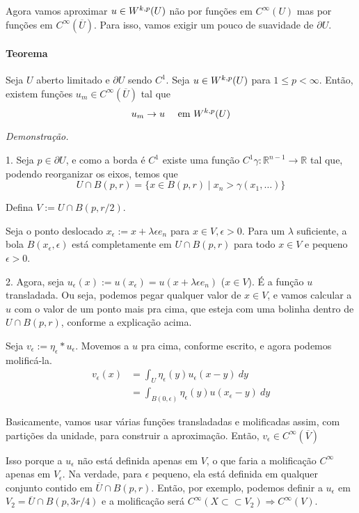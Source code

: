 \documentclass[11pt]{article}
\newcommand{\R}{\mathbb{R}}
\newcommand{\pu}{\partial U}
\newcommand{\e}{\epsilon}
\begin{document}
Agora vamos aproximar \( u \in W^{k,p}(U) \) não por funções em \( C^\infty(U) \) mas por funções em \( C^\infty(\overline{U}) \). Para isso, vamos exigir um pouco de suavidade de \( \pu \).

\paragraph{Teorema} Seja \( U \) aberto limitado e \( \pu \) sendo \( C^1 \). Seja \( u \in W^{k,p}(U) \) para \( 1 \leq p < \infty \). Então, existem funções \( u_m \in C^\infty(\overline{U}) \) tal que \[ u_m \rightarrow u \quad \text{ em }W^{k,p}(U) \]

\textit{Demonstração.} 

1. Seja \( p \in \pu  \), e como a borda é \( C^1 \) existe uma função \( C^1 \gamma:\R^{n-1}\rightarrow \R\) tal que, podendo reorganizar os eixos, temos que \[ U \cap B(p,r) = \{ x \in B(p,r) \mid x_n > \gamma(x_1, \ldots)\} \]

Defina \( V:= U \cap B(p, r/2) \).

Seja o ponto deslocado \( x_\e := x + \lambda\e e_n \) para \( x \in V, \e>0 \). Para um \( \lambda \) suficiente, a bola \( B(x_\e, \e) \) está completamente em \( U \cap B(p,r) \) para todo \( x \in V \) e pequeno \( \e>0 \).


2. Agora, seja \( u_\e(x) := u(x_\e) = u(x + \lambda\e e_n ) \) (\( x \in V \)). É a função \( u \) transladada. Ou seja, podemos pegar qualquer valor de \( x \in V \), e vamos calcular a \( u \) com o valor de um ponto mais pra cima, que esteja com uma bolinha dentro de \( U \cap B(p,r) \), conforme a explicação acima.

Seja \( v_\e :=  \eta_\e * u_\e \). Movemos a \( u \) pra cima, conforme escrito, e agora podemos molificá-la.\begin{align*}
	v_\e(x) &= \int_U \eta_\e(y) u_\e (x-y)\ dy\\
	&= \int_{B(0,\e)} \eta_\e(y) u(x_\e -y)\ dy
\end{align*}

Basicamente, vamos usar várias funções transladadas e molificadas assim, com partições da unidade, para construir a aproximação. Então, \( v_\e \in C^\infty(\overline{V}) \)

Isso porque a $u_\e$ não está definida apenas em $V$, o que faria a molificação $ C^\infty $ apenas em $V_\e$. Na verdade, para $\e$ pequeno, ela está definida em qualquer conjunto contido em $\overline{U} \cap B(p,r)$. Então, por exemplo, podemos definir a $u_\e$ em $V_2  = \overline{U} \cap B(p, 3r/4)$ e a molificação será $C^\infty(X \subset\subset V_2) \Rightarrow C^\infty(V)$.
\end{document}
